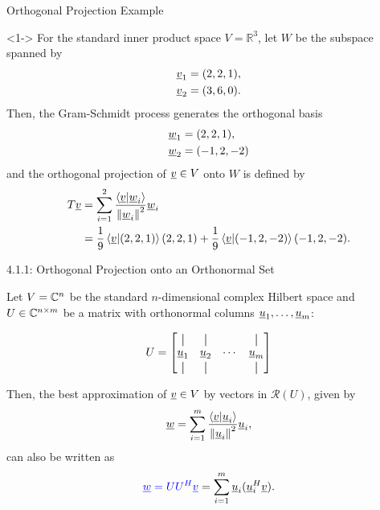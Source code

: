 \documentclass[10pt,english,aspectratio=169]{beamer}
\begin{document}
\begin{frame}{Orthogonal Projection Example}

\begin{example}<1->
For the standard inner product space $V = \mathbb{R}^3$, let $W$ be the subspace spanned by\vspace{-4mm}
\begin{align*}
\underline{v}_1 &= (2,2,1), \\
\underline{v}_2 &= (3,6,0).
\end{align*}
Then, the Gram-Schmidt process generates the orthogonal basis
 \vspace{-2mm}
\begin{align*}
\underline{w}_1 &= (2,2,1), \\
\underline{w}_2 &= (-1,2,-2)
\end{align*}
and the orthogonal projection of $\underline{v} \in V$ onto $W$ is defined by \vspace{-2mm}
\begin{align*}
T \underline{v} &= \sum_{i=1}^2 \frac{ \left\langle \underline{v} | \underline{w}_i \right\rangle }{ \left\| \underline{w}_i \right\|^2 } \underline{w}_i \\ &= \frac{1}{9} \left\langle \underline{v} | (2,2,1) \right\rangle (2,2,1) + \frac{1}{9} \left\langle \underline{v} | (-1,2,-2) \right\rangle (-1,2,-2).
\end{align*}
\vspace*{-3.5mm}
\end{example}

\end{frame}


\newcommand*{\vertbar}{\rule[-1ex]{0.5pt}{2.5ex}}

\begin{frame}{4.1.1: Orthogonal Projection onto an Orthonormal Set}

Let $V = \mathbb{C}^n$ be the standard $n$-dimensional complex Hilbert space and $U \in \mathbb{C}^{n\times m}$ be a matrix with orthonormal columns $\underline{u}_1,\ldots,\underline{u}_m$:

\[ U = \begin{bmatrix} \vertbar & \vertbar & & \vertbar \\ \vecnot{u}_1 & \vecnot{u}_2 & \cdots & \vecnot{u}_m \\ \vertbar & \vertbar & & \vertbar \end{bmatrix} \]

\vspace{4mm}

Then, the best approximation of $\underline{v}\in V$ by vectors in $\mathcal{R}(U)$, given by
\begin{equation*}
\underline{w} = \sum_{i=1}^m \frac{ \left\langle \underline{v} | \underline{u}_i \right\rangle }{ \left\| \underline{u}_i \right\|^2 } \underline{u}_i,
\end{equation*}
can also be written as
\[ {\color{blue}\underline{w} = U U^H \underline{v}} = \sum_{i=1}^m \underline{u}_i (\underline{u}_i^H \underline{v}). \]

\end{frame}
\end{document}
